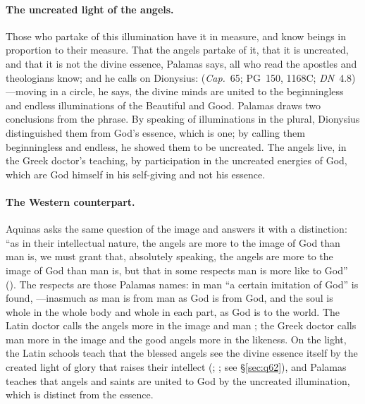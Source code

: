 \paragraph{The uncreated light of the angels.} Those who partake of this
illumination have it in measure, and know beings in proportion to their
measure. That the angels partake of it, that it is uncreated,
and that it is not the divine essence, Palamas says, all who read the
apostles and theologians know; and he calls on Dionysius:  (\emph{Cap.}\ 65; PG~150,
1168C; \emph{DN}~4.8)---moving in a circle, he says, the divine minds are
united to the beginningless and endless illuminations of the Beautiful and
Good. Palamas draws two conclusions from the phrase. By speaking of
illuminations in the plural, Dionysius distinguished them from God's
essence, which is one; by calling them beginningless and endless, he showed
them to be uncreated. The angels live, in the Greek doctor's teaching, by
participation in the uncreated energies of God, which are God himself in his
self-giving and not his essence.

\paragraph{The Western counterpart.} Aquinas asks the same question of the
image and answers it with a distinction: ``as in their intellectual nature,
the angels are more to the image of God than man is, we must grant that,
absolutely speaking, the angels are more to the image of God than man is,
but that in some respects man is more like to God'' (). The
respects are those Palamas names: in man ``a certain imitation of God''
is found, ---inasmuch as man is
from man as God is from God, and the soul is whole in the whole body and
whole in each part, as God is to the world. The Latin doctor calls the
angels more in the image  and man ;
the Greek doctor calls man more in the image and the good angels more in the
likeness. On the light, the Latin schools teach that the blessed angels see
the divine essence itself by the created light of glory that raises their
intellect (; ; see \S\ref{sec:q62}), and
Palamas teaches that angels and saints are united to God by the uncreated
illumination, which is distinct from the essence.

